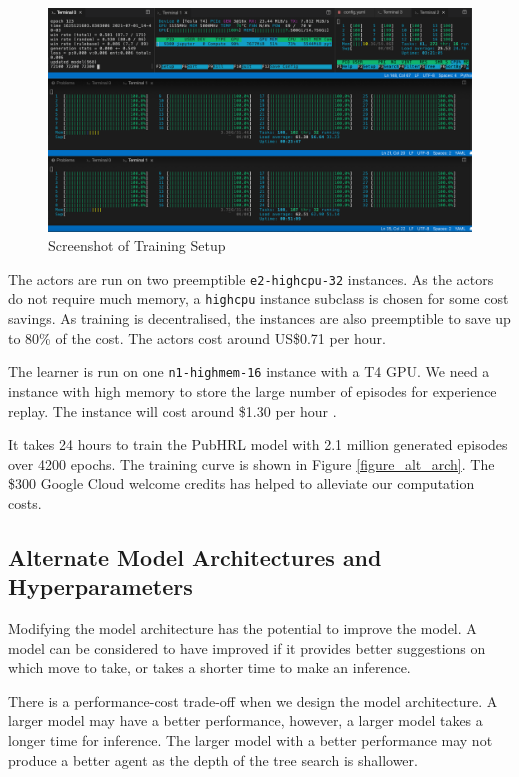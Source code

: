 \begin{figure}[h]
\centering
\includegraphics[width=\textwidth]{images/training-resources.png}
\caption{Screenshot of Training Setup}
\label{figure_training_setup}
\end{figure}

The actors are run on two preemptible \verb|e2-highcpu-32| instances. As the actors do not require much memory, a \verb|highcpu| instance subclass is chosen for some cost savings. As training is decentralised, the instances are also preemptible to save up to 80\% of the cost. The actors cost around US\$0.71 per hour.

The learner is run on one \verb|n1-highmem-16| instance with a T4 GPU. We need a instance with high memory to store the large number of episodes for experience replay. The instance will cost around \$1.30 per hour \cite{website_google_compute_engine_pricing}.

It takes 24 hours to train the PubHRL model with 2.1 million generated episodes over 4200 epochs. The training curve is shown in Figure \ref{figure_alt_arch}. The \$300 Google Cloud welcome credits has helped to alleviate our computation costs.

\subsection{Alternate Model Architectures and Hyperparameters}
\label{subsection_alt_model_arch_hyper_param}

Modifying the model architecture has the potential to improve the model. A model can be considered to have improved if it provides better suggestions on which move to take, or takes a shorter time to make an inference.

There is a performance-cost trade-off when we design the model architecture. A larger model may have a better performance, however, a larger model takes a longer time for inference. The larger model with a better performance may not produce a better agent as the depth of the tree search is shallower. 

